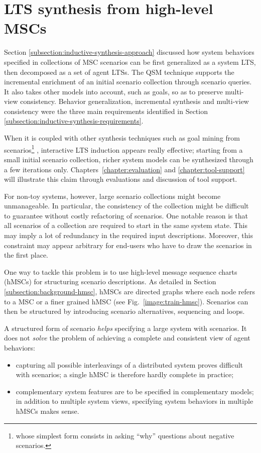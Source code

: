 \section{LTS synthesis from high-level MSCs\label{section:inductive-from-hMSC}}

Section \ref{subsection:inductive-synthesis-approach} discussed how system behaviors specified in collections of MSC scenarios can be first generalized as a system LTS, then decomposed as a set of agent LTSs. The QSM technique supports the incremental enrichment of an initial scenario collection through scenario queries. It also takes other models into account, such as goals, so as to preserve multi-view consistency. Behavior generalization, incremental synthesis and multi-view consistency were the three main requirements identified in Section \ref{subsection:inductive-synthesis-requirements}. 

When it is coupled with other synthesis techniques such as goal mining from scenarios\footnote{whose simplest form consists in asking ``why'' questions about negative scenarios.} \cite{Damas:2006}, interactive LTS induction appears really effective; starting from a small initial scenario collection, richer system models can be synthesized through a few iterations only. Chapters~\ref{chapter:evaluation} and \ref{chapter:tool-support} will illustrate this claim through evaluations and discussion of tool support.

For non-toy systems, however, large scenario collections might become unmanageable. In particular, the consistency of the collection might be difficult to guarantee without costly refactoring of scenarios. One notable reason is that all scenarios of a collection are required to start in the same system state. This may imply a lot of redundancy in the required input descriptions. Moreover, this constraint may appear arbitrary for end-users who have to draw the scenarios in the first place.

One way to tackle this problem is to use high-level message sequence charts (hMSCs) for structuring scenario descriptions. As detailed in Section \ref{subsection:background-hmsc}, hMSCs are directed graphs where each node refers to a MSC or a finer grained hMSC (see Fig.~\ref{image:train-hmsc}). Scenarios can then be structured by introducing scenario alternatives, sequencing and loops.

A structured form of scenario \emph{helps} specifying a large system with scenarios. It does not \emph{solve} the problem of achieving a complete and consistent view of agent behaviors:
\begin{itemize}
\item capturing all possible interleavings of a distributed system proves difficult with scenarios; a single hMSC is therefore hardly complete in practice;
\item complementary system features are to be specified in complementary models; in addition to multiple system views, specifying system behaviors in multiple hMSCs makes sense.
\end{itemize}

